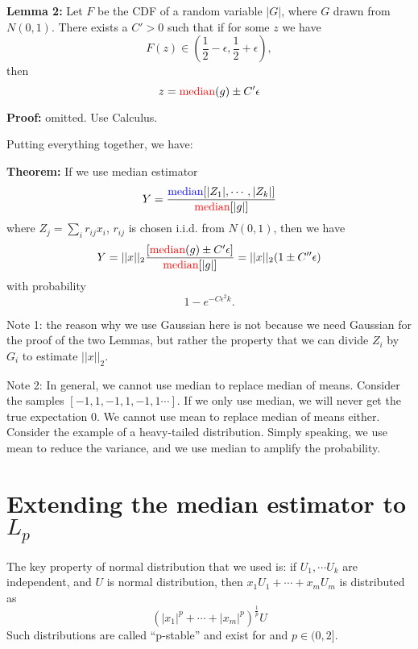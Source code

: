 \documentclass[11pt]{article}
\begin{document}
\textbf{Lemma 2:} Let $F$ be the CDF of a random variable $|G|$, where $G$ drawn from $N(0,1)$. There exists a $C'>0$ such that if for some $z$ we have 
\begin{equation*}
    F(z) \in (\frac{1}{2} - \epsilon, \frac{1}{2} + \epsilon),
\end{equation*}
then
\begin{equation*}
z = {\color{red} \text{median}}(g) \pm C' \epsilon
\end{equation*}

\textbf{Proof:} omitted. Use Calculus.

Putting everything together, we have:

\textbf{Theorem:} If we use median estimator 
\begin{equation*}
Y=\frac{{\color{blue} \text{median}}[ |Z_1|, \cdots , |Z_k| ]}{ {\color{red} \text{median}}[|g|] }
\end{equation*}
where $Z_j = \sum_i r_{ij}x_i$, $r_{ij}$ is chosen i.i.d. from $N(0,1)$, then we have
\begin{equation*}
Y= ||x||_2 \frac{[{\color{red} \text{median}}(g) \pm C' \epsilon]}{{\color{red} \text{median}}[|g|]}=||x||_2 (1 \pm C'' \epsilon)
\end{equation*}
with probability 
\begin{equation*}
     1-e^{-C \epsilon^2 k}.
\end{equation*}

Note 1: the reason why we use Gaussian here is not because we need Gaussian for the proof of the two Lemmas, but rather the property that we can divide $Z_i$ by $G_i$ to estimate $||x||_2$.

Note 2: In general, we cannot use median to replace median of means. Consider the samples $[-1, 1, -1, 1, -1, 1 \cdots]$. If we only use median, we will never get the true expectation 0. We cannot use mean to replace median of means either. Consider the example of a heavy-tailed distribution. Simply speaking, we use mean to reduce the variance, and we use median to amplify the probability.

\section{Extending the median estimator to $L_p$}

The key property of normal distribution that we used is: if $U_1, \cdots U_k$ are independent, and $U$ is normal distribution, then $x_1 U_1 + \cdots + x_m U_m$ is distributed as 
\begin{equation*}
    (|x_1|^p + \cdots + |x_m|^p)^{\frac{1}{p}}U
\end{equation*}
Such distributions are called ``p-stable'' and exist for and $p \in (0,2]$.
\end{document}
